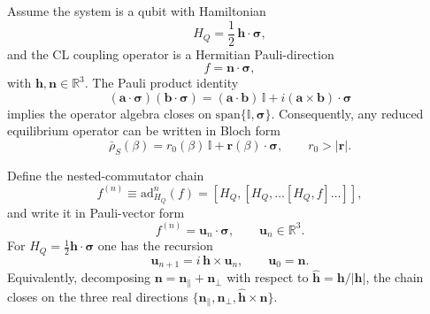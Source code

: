 



Assume the system is a qubit with Hamiltonian
\begin{equation}
    H_Q=\frac12\,\mathbf h\cdot\boldsymbol\sigma,
\end{equation}
and the CL coupling operator is a Hermitian Pauli-direction
\begin{equation}
    f=\mathbf n\cdot\boldsymbol\sigma,
\end{equation}
with $\mathbf h,\mathbf n\in\mathbb R^3$. The Pauli product identity
\begin{equation}
    (\mathbf a\cdot\boldsymbol\sigma)(\mathbf b\cdot\boldsymbol\sigma)
    =
    (\mathbf a\cdot\mathbf b)\,\mathbb I
    +
    i(\mathbf a\times\mathbf b)\cdot\boldsymbol\sigma
    \label{eq:pauli_product}
\end{equation}
implies the operator algebra closes on $\mathrm{span}\{\mathbb I,\boldsymbol\sigma\}$.
Consequently, any reduced equilibrium operator can be written in Bloch form
\begin{equation}
    \bar\rho_S(\beta)= r_0(\beta)\,\mathbb I + \mathbf r(\beta)\cdot\boldsymbol\sigma,
    \qquad r_0>|\mathbf r|.
    \label{eq:bar_rho_bloch}
\end{equation}


Define the nested-commutator chain
\begin{equation}
    f^{(n)} \equiv \mathrm{ad}_{H_Q}^n(f) = [H_Q,[H_Q,\dots[H_Q,f]\dots]],
\end{equation}
and write it in Pauli-vector form
\begin{equation}
    f^{(n)} = \mathbf u_n\cdot\boldsymbol\sigma,
    \qquad \mathbf u_n\in\mathbb R^3.
    \label{eq:fn_vector}
\end{equation}
For $H_Q=\frac12\mathbf h\cdot\boldsymbol\sigma$ one has the recursion
\begin{equation}
    \mathbf u_{n+1} = i\,\mathbf h\times \mathbf u_n,
    \qquad \mathbf u_0=\mathbf n.
    \label{eq:un_recursion}
\end{equation}
Equivalently, decomposing $\mathbf n=\mathbf n_\parallel+\mathbf n_\perp$ with respect to
$\hat{\mathbf h}=\mathbf h/|\mathbf h|$,
the chain closes on the three real directions
$\{\mathbf n_\parallel,\mathbf n_\perp,\hat{\mathbf h}\times\mathbf n\}$.


